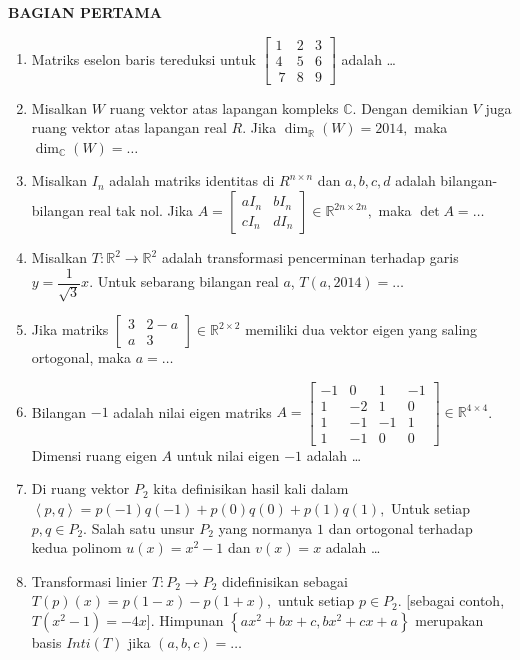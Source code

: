 \documentclass[12pt,twoside]{article}
\begin{document}
\textbf{BAGIAN PERTAMA}
\begin{enumerate}
	\item Matriks eselon baris tereduksi untuk $\left[ \begin{array}{ccc}
				      1 & 2 & 3 \\ 4&5&6 \\\ 7&8&9
			      \end{array} \right]$ adalah \dots

	\item Misalkan $W$ ruang vektor atas lapangan kompleks $\mathbb{C}$. Dengan demikian $V$ juga ruang vektor atas lapangan real $R$. Jika $\dim_{\mathbb{R}}(W)= 2014,$ maka $\dim_{\mathbb{C}}(W)=\dots$

	\item Misalkan $I_n$ adalah matriks identitas di $R^{n \times n}$ dan $a,b,c,d$ adalah bilangan-bilangan real tak nol. Jika $A = \left[ \begin{array}{cc}
				      aI_n & bI_n \\ cI_n & dI_n
			      \end{array} \right] \in \mathbb{R}^{2n \times 2n}, $ maka $\det A = \dots$

	\item Misalkan $T: \mathbb{R}^2 \to \mathbb{R}^2 $ adalah transformasi pencerminan terhadap garis $y = \dfrac{1}{\sqrt{3}}x$. Untuk sebarang bilangan real $a$, $T(a,2014)=\dots$

	\item Jika matriks $\left[ \begin{array}{cc}
				      3 & 2-a \\a&3
			      \end{array} \right] \in \mathbb{R}^{2 \times 2}$ memiliki dua vektor eigen yang saling ortogonal, maka $a = \dots$

	\item Bilangan $-1$ adalah nilai eigen matriks $A = \left[ \begin{array}{cccc}
				      -1 & 0  & 1  & -1 \\
				      1  & -2 & 1  & 0  \\
				      1  & -1 & -1 & 1  \\
				      1  & -1 & 0  & 0
			      \end{array} \right] \in \mathbb{R}^{4 \times 4}$. Dimensi ruang eigen $A$ untuk nilai eigen $-1$ adalah \dots

	\item Di ruang vektor $P_2$ kita definisikan hasil kali dalam $\left< p,q \right> = p(-1)q(-1)+p(0)q(0)+p(1)q(1),$ Untuk setiap $p,q \in P_2$. Salah satu unsur $P_2$ yang normanya $1$ dan ortogonal terhadap kedua polinom $u(x)=x^2-1$ dan $v(x)=x$ adalah \dots

	\item Transformasi linier $T : P_2 \to P_2$ didefinisikan sebagai $T(p)(x)=p(1-x)-p(1+x),$ untuk setiap $p \in P_2.$ [sebagai contoh, $T(x^2-1)=-4x$]. Himpunan $\left\lbrace ax^2 + bx +c, bx^2 + cx + a \right\rbrace$ merupakan basis $Inti(T)$ jika $(a,b,c)=\dots$
\end{enumerate}
\end{document}
